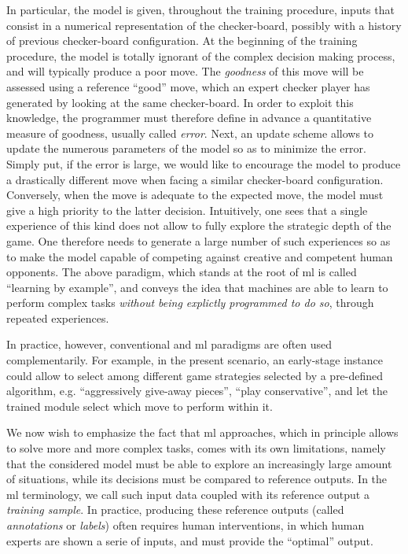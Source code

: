 In particular, the model is given, throughout the training procedure, inputs that consist in a numerical representation of the checker-board, possibly with a history of previous checker-board configuration.
At the beginning of the training procedure, the model is totally ignorant of the complex decision making process, and will typically produce a poor move.
The \textit{goodness} of this move will be assessed using a reference ``good'' move, which an expert checker player has generated by looking at the same checker-board.
In order to exploit this knowledge, the programmer must therefore define in advance a quantitative measure of goodness, usually called \textit{error}.
Next, an update scheme allows to update the numerous parameters of the model so as to minimize the error.
Simply put, if the error is large, we would like to encourage the model to produce a drastically different move when facing a similar checker-board configuration.
Conversely, when the move is adequate to the expected move, the model must give a high priority to the latter decision.
Intuitively, one sees that a single experience of this kind does not allow to fully explore the strategic depth of the game.
One therefore needs to generate a large number of such experiences so as to make the model capable of competing against creative and competent human opponents.
The above paradigm, which stands at the root of \gls{ml} is called ``learning by example'', and conveys the idea that machines are able to learn to perform complex tasks \textit{without being explictly programmed to do so}, through repeated experiences.

In practice, however, conventional and \gls{ml} paradigms are often used complementarily.
For example, in the present scenario, an early-stage instance could allow to select among different game strategies selected by a pre-defined algorithm, e.g. ``aggressively give-away pieces'', ``play conservative'', and let the trained module select which move to perform within it.

We now wish to emphasize the fact that \gls{ml} approaches, which in principle allows to solve more and more complex tasks, comes with its own limitations, namely that the considered model must be able to explore an increasingly large amount of situations, while its decisions must be compared to reference outputs.
In the \gls{ml} terminology, we call such input data coupled with its reference output a \textit{training sample}.
In practice, producing these reference outputs (called \textit{annotations} or \textit{labels}) often requires human interventions, in which human experts
are shown a serie of inputs, and must provide the ``optimal'' output.

